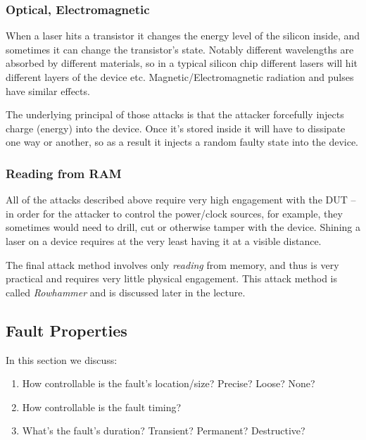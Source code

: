 \subsubsection{Optical, Electromagnetic}\label{subsubsec:optical_electromagnetic}
When a laser hits a transistor it changes the energy level of the silicon inside, and sometimes it can change the transistor's state. Notably different wavelengths are absorbed by different materials, so in a typical silicon chip different lasers will hit different layers of the device etc. Magnetic/Electromagnetic radiation and pulses have similar effects.

The underlying principal of those attacks is that the attacker forcefully injects charge (energy) into the device. Once it's stored inside it will have to dissipate one way or another, so as a result it injects a random faulty state into the device.

\subsubsection{Reading from RAM}\label{subsubsec:reading_from_ram}
All of the attacks described above require very high engagement with the DUT -- in order for the attacker to control the power/clock sources, for example, they sometimes would need to drill, cut or otherwise tamper with the device. Shining a laser on a device requires at the very least having it at a visible distance.

The final attack method involves only \emph{reading} from memory, and thus is very practical and requires very little physical engagement. This attack method is called \emph{Rowhammer} and is discussed later in the lecture.


\subsection{Fault Properties}\label{subsec:fault_properties}
In this section we discuss:
\begin{enumerate}
	\item How controllable is the fault's location/size? Precise? Loose? None?
	\item How controllable is the fault timing?
	\item What's the fault's duration? Transient? Permanent? Destructive?
\end{enumerate}


